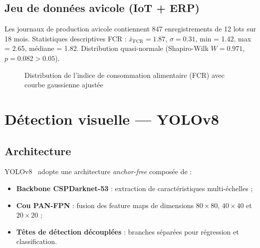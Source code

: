 \documentclass[12pt,a4paper,twoside]{report}
\newcounter{hi}
\begin{document}
\subsection{Jeu de données avicole (IoT + ERP)}
Les journaux de production avicole contiennent 847 enregistrements de 12 lots
sur 18 mois.
Statistiques descriptives FCR :
$\bar{x}_\text{FCR} = 1.87$, $\sigma = 0.31$, min = 1.42, max = 2.65,
médiane = 1.82. Distribution quasi-normale (Shapiro-Wilk $W = 0.971$,
$p = 0.082 > 0.05$).

\begin{figure}[H]
\centering
{}
\caption{Distribution de l'indice de consommation alimentaire (FCR) avec courbe gaussienne ajustée}
\label{fig:fcr_hist}
\end{figure}

\section{Détection visuelle — YOLOv8}

\subsection{Architecture}

YOLOv8~\cite{yolov8_2023} adopte une architecture \textit{anchor-free} composée de :
\begin{itemize}
  \item \textbf{Backbone CSPDarknet-53} : extraction de caractéristiques multi-échelles ;
  \item \textbf{Cou PAN-FPN} : fusion des feature maps de dimensions $80\times80$, $40\times40$ et $20\times20$ ;
  \item \textbf{Têtes de détection découplées} : branches séparées pour régression et classification.
\end{itemize}
\end{document}
